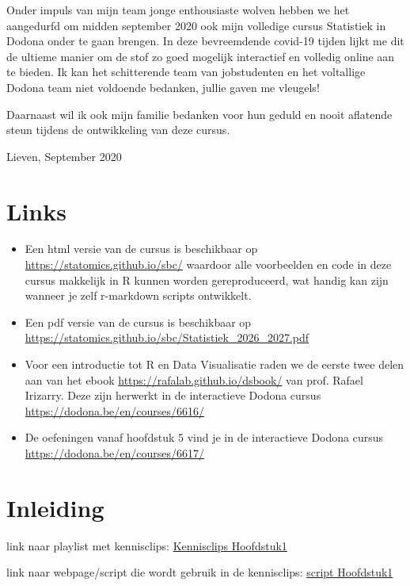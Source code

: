 \documentclass[
  12pt,dutch]{book}
\theoremstyle{definition}
\theoremstyle{definition}
\theoremstyle{definition}
\theoremstyle{definition}
\theoremstyle{remark}
\begin{document}
Onder impuls van mijn team jonge enthousiaste wolven hebben we het aangedurfd om midden september 2020 ook mijn volledige cursus Statistiek in Dodona onder te gaan brengen. In deze bevreemdende covid-19 tijden lijkt me dit de ultieme manier om de stof zo goed mogelijk interactief en volledig online aan te bieden.
Ik kan het schitterende team van jobstudenten en het voltallige Dodona team niet voldoende bedanken, jullie gaven me vleugels!

Daarnaast wil ik ook mijn familie bedanken voor hun geduld en nooit aflatende steun tijdens de ontwikkeling van deze cursus.

Lieven, September 2020

\chapter*{Links}\label{links}

\begin{itemize}
\item
  Een html versie van de cursus is beschikbaar op \url{https://statomics.github.io/sbc/} waardoor alle voorbeelden en code in deze cursus makkelijk in R kunnen worden gereproduceerd, wat handig kan zijn wanneer je zelf r-markdown scripts ontwikkelt.
\item
  Een pdf versie van de cursus is beschikbaar op \url{https://statomics.github.io/sbc/Statistiek_2026_2027.pdf}
\item
  Voor een introductie tot R en Data Visualisatie raden we de eerste twee delen aan van het ebook \url{https://rafalab.github.io/dsbook/} van prof. Rafael Irizarry. Deze zijn herwerkt in de interactieve Dodona cursus \url{https://dodona.be/en/courses/6616/}
\item
  De oefeningen vanaf hoofdstuk 5 vind je in de interactieve Dodona cursus \url{https://dodona.be/en/courses/6617/}
\end{itemize}

\chapter{Inleiding}\label{inleiding}

link naar playlist met kennisclips:
\href{https://www.youtube.com/playlist?list=PLZH1hP8_LbJIk4G2AZYYKvgZLjRR-1-Iw}{Kennisclips Hoofdstuk1}

link naar webpage/script die wordt gebruik in de kennisclips: \href{https://statomics.github.io/sbc/rmd/01-intro.html}{script Hoofdstuk1}
\end{document}
